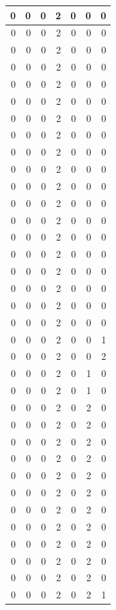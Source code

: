 \documentclass[
  12pt,
]{krantz}
\begin{document}
\begin{tabular}{r|r|r|r|r|r|r}
\hline
0 & 0 & 0 & 2 & 0 & 0 & 0\\
\hline
0 & 0 & 0 & 2 & 0 & 0 & 0\\
\hline
0 & 0 & 0 & 2 & 0 & 0 & 0\\
\hline
0 & 0 & 0 & 2 & 0 & 0 & 0\\
\hline
0 & 0 & 0 & 2 & 0 & 0 & 0\\
\hline
0 & 0 & 0 & 2 & 0 & 0 & 0\\
\hline
0 & 0 & 0 & 2 & 0 & 0 & 0\\
\hline
0 & 0 & 0 & 2 & 0 & 0 & 0\\
\hline
0 & 0 & 0 & 2 & 0 & 0 & 0\\
\hline
0 & 0 & 0 & 2 & 0 & 0 & 0\\
\hline
0 & 0 & 0 & 2 & 0 & 0 & 0\\
\hline
0 & 0 & 0 & 2 & 0 & 0 & 0\\
\hline
0 & 0 & 0 & 2 & 0 & 0 & 0\\
\hline
0 & 0 & 0 & 2 & 0 & 0 & 0\\
\hline
0 & 0 & 0 & 2 & 0 & 0 & 0\\
\hline
0 & 0 & 0 & 2 & 0 & 0 & 0\\
\hline
0 & 0 & 0 & 2 & 0 & 0 & 0\\
\hline
0 & 0 & 0 & 2 & 0 & 0 & 0\\
\hline
0 & 0 & 0 & 2 & 0 & 0 & 0\\
\hline
0 & 0 & 0 & 2 & 0 & 0 & 1\\
\hline
0 & 0 & 0 & 2 & 0 & 0 & 2\\
\hline
0 & 0 & 0 & 2 & 0 & 1 & 0\\
\hline
0 & 0 & 0 & 2 & 0 & 1 & 0\\
\hline
0 & 0 & 0 & 2 & 0 & 2 & 0\\
\hline
0 & 0 & 0 & 2 & 0 & 2 & 0\\
\hline
0 & 0 & 0 & 2 & 0 & 2 & 0\\
\hline
0 & 0 & 0 & 2 & 0 & 2 & 0\\
\hline
0 & 0 & 0 & 2 & 0 & 2 & 0\\
\hline
0 & 0 & 0 & 2 & 0 & 2 & 0\\
\hline
0 & 0 & 0 & 2 & 0 & 2 & 0\\
\hline
0 & 0 & 0 & 2 & 0 & 2 & 0\\
\hline
0 & 0 & 0 & 2 & 0 & 2 & 0\\
\hline
0 & 0 & 0 & 2 & 0 & 2 & 0\\
\hline
0 & 0 & 0 & 2 & 0 & 2 & 0\\
\hline
0 & 0 & 0 & 2 & 0 & 2 & 1\\

\end{tabular}
\end{document}
